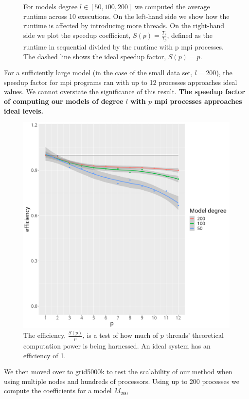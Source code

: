 \documentclass[a4paper]{article}
\theoremstyle{definition}
\begin{document}
\begin{figure}[h!]
\begin{minipage}{0.45\linewidth}
\end{minipage}
\caption{For models degree $l \in [50, 100, 200]$ we computed the average runtime across 10 executions. On the left-hand side we show how the runtime is affected
by introducing more threads. On the right-hand side we plot the speedup coefficient, $S(p) = \frac{T_s}{T_p}$, defined as the runtime in sequential divided by the 
runtime with p mpi processes. The dashed line shows the ideal speedup factor, $S(p) = p$.}
\end{figure}

For a sufficiently large model (in the case of the small data set, $l = 200$), the speedup factor for mpi programs ran with up to 12 processes approaches ideal values. We cannot
overstate the significance of this result. \textbf{The speedup factor of computing our models of degree $l$ with $p$ mpi processes approaches ideal levels.}

\begin{figure}[h!]
    \centering
    \includegraphics[width=0.5\linewidth]{media/mpi_efficieny.png}
    \caption{The efficiency, $\frac{S(p)}{p}$, is a test of how much of $p$ threads' theoretical computation power is
    being harnessed. An ideal system has an efficiency of 1.}

\end{figure}

We then moved over to grid5000k to test the scalability of our method when using multiple nodes and hundreds
of processors. Using up to 200 processes we compute the coefficients for a model $M_{200}$
\end{document}
